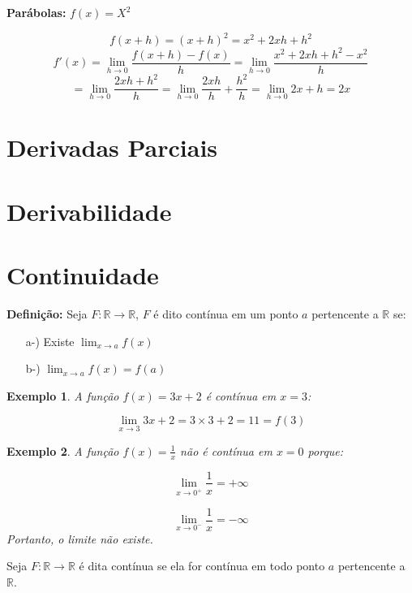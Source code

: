 \documentclass{book}
\numberwithin{defn}{chapter}
\newtheorem{exe}{Exemplo}
\numberwithin{exe}{chapter}
\numberwithin{ex}{chapter}
\numberwithin{obs}{chapter}
\numberwithin{fato}{chapter}
\numberwithin{resp}{chapter}
\begin{document}
\textbf{Parábolas:} \(f(x) = X^2\)

\[f(x+h) = (x+h)^2 = x^2 + 2xh + h^2\]
\[f'(x) = \lim_{h \to 0} \frac{f(x+h) - f(x)}{h} = \lim_{h \to 0} \frac{x^2 + 2xh + h^2 - x^2}{h}\]
\[= \lim_{h \to 0} \frac{2xh + h^2}{h} = \lim_{h \to 0} \frac{2xh}{h} + \frac{h^2}{h} = \lim_{h \to 0} 2x + h = 2x\]




\section{Derivadas Parciais} 
\section{Derivabilidade} %
\section{Continuidade} %

\textbf{Definição:} Seja \( F: \mathbb{R} \rightarrow \mathbb{R} \), \( F \) é dito contínua em um ponto \( a \) pertencente a \( \mathbb{R} \) se:

\begin{itemize}
    \item[a-)] Existe \( \lim_{x \to a} f(x) \)
    \item[b-)] \( \lim_{x \to a} f(x) = f(a) \)
\end{itemize}

\begin{exe} A função \( f(x) = 3x + 2 \) é contínua em \( x = 3 \):

\[
\lim_{x \to 3} 3x + 2 = 3 \times 3 + 2 = 11 = f(3)
\]
\end{exe}

\begin{exe} A função \( f(x) = \frac{1}{x} \) não é contínua em \( x = 0 \) porque:

\[
\lim_{x \to 0^+} \frac{1}{x} = +\infty
\]

\[
\lim_{x \to 0^-} \frac{1}{x} = -\infty
\]
Portanto, o limite não existe.
\end{exe}

\noindent Seja \( F: \mathbb{R} \rightarrow \mathbb{R} \) é dita contínua se ela for contínua em todo ponto \( a \) pertencente a \( \mathbb{R} \).
\end{document}
